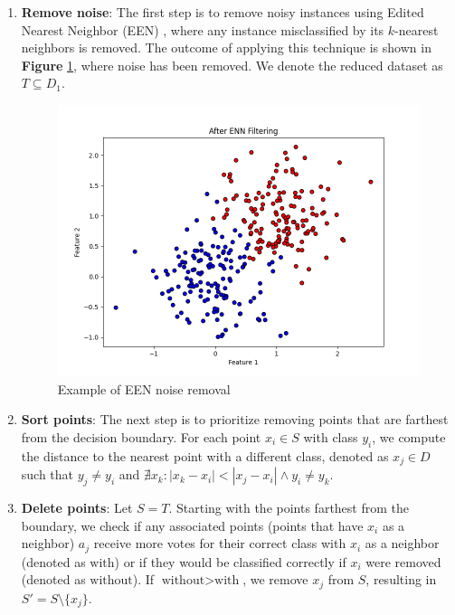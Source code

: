\begin{enumerate}
	\item \textbf{Remove noise}: The first step is to remove noisy instances using Edited Nearest Neighbor (EEN) \cite{wilson1972asymptotic}, where any instance misclassified by its \( k \)-nearest neighbors is removed. The outcome of applying this technique is shown in \textbf{Figure} \ref{fig:2dEEN}, where noise has been removed. We denote the reduced dataset as $ T \subseteq D_1 $.
	\begin{figure}[ht]
		\centering
		\includegraphics[width=\textwidth]{figures/2dEEN} %
		\caption{Example of EEN noise removal}
		\label{fig:2dEEN}
	\end{figure}
	
	\item \textbf{Sort points}: The next step is to prioritize removing points that are farthest from the decision boundary. For each point $ x_i \in S $ with class $ y_i $, we compute the distance to the nearest point with a different class, denoted as $ x_j \in D $ such that $ y_j \neq y_i $ and $ \nexists x_k : |x_k - x_i| < |x_j - x_i| \land y_i \neq y_k $.
	
	\item \textbf{Delete points}: Let $ S = T $. Starting with the points farthest from the boundary, we check if any associated points (points that have $ x_i $ as a neighbor) $ a_j $ receive more votes for their correct class with $ x_i $ as a neighbor (denoted as $ \text{with} $) or if they would be classified correctly if $ x_i $ were removed (denoted as $ \text{without} $). If $ \text{without} > \text{with} $, we remove $ x_j $ from $ S $, resulting in $ S' = S \setminus \{x_j\} $.
	

\end{enumerate}
